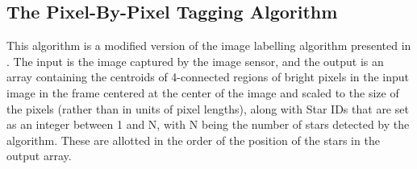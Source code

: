 \documentclass[../../main.tex]{subfiles}
\begin{document}
\subsection{The Pixel-By-Pixel Tagging Algorithm} \label{subsec:fe_pixel}

This algorithm is a modified version of the image labelling algorithm presented in \cite{imglabelseq}. The input is the image captured by the image sensor, and the output is an array containing the centroids of 4-connected regions of bright pixels in the input image in the frame centered at the center of the image and scaled to the size of the pixels (rather than in units of pixel lengths), along with Star IDs that are set as an integer between 1 and N, with N being the number of stars detected by the algorithm. These are allotted in the order of the position of the stars in the output array.
\end{document}
